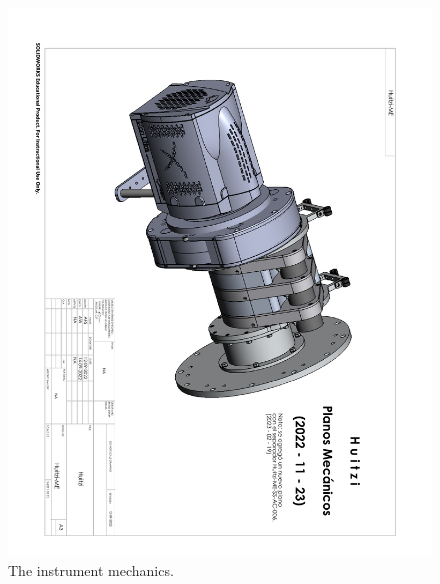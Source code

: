 \begin{figure}
\begin{center}
\includegraphics[angle=180,width=0.9\linewidth]{figures/huitzi-f20-3d.pdf}
\end{center}
\caption{The instrument mechanics.}
\label{figure:huitzi-f20-3d}
\end{figure}

